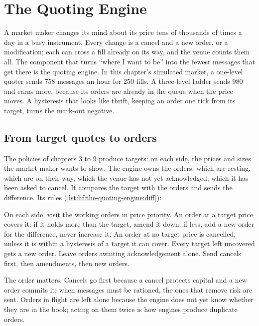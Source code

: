 \chapter{The Quoting Engine}\label{ch:hf:the-quoting-engine}

A market maker changes its mind about its price tens of thousands of times a day in a busy instrument. Every change is a cancel and a new order, or
a modification; each can cross a fill already on its way, and the venue counts them all. The component that turns ``where I want to be'' into the
fewest messages that get there is the quoting engine. In this chapter's simulated market, a one-level quoter sends 758 messages an hour for 250
fills. A three-level ladder sends 980 and earns more, because its orders are already in the queue when the price moves. A hysteresis that looks
like thrift, keeping an order one tick from its target, turns the mark-out negative.

\section{From target quotes to orders}

The policies of chapters 3 to 9 produce targets: on each side, the prices and sizes the market maker wants to show. The engine owns the orders:
which are resting, which are on their way, which the venue has not yet acknowledged, which it has been asked to cancel. It compares the target with
the orders and sends the difference. Its rules (\cref{lst:hf:the-quoting-engine:diff}):

\begin{method}\label{met:hf:the-quoting-engine:diff}
On each side, visit the working orders in price priority. An order at a target price covers it: if it holds more than the target, amend it down;
if less, add a new order for the difference, never increase it. An order at no target price is cancelled, unless it is within a hysteresis of a
target it can cover. Every target left uncovered gets a new order. Leave orders awaiting acknowledgement alone. Send cancels first, then
amendments, then new orders.
\end{method}

The order matters. Cancels go first because a cancel protects capital and a new order commits it; when messages must be rationed, the ones that
remove risk are sent. Orders in flight are left alone because the engine does not yet know whether they are in the book; acting on them twice is how
engines produce duplicate orders.

